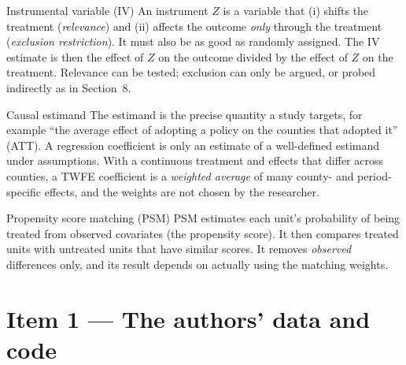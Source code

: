 \documentclass[11pt]{article}
\begin{document}
\begin{conceptbox}{Instrumental variable (IV)}
An instrument $Z$ is a variable that (i) shifts the treatment (\emph{relevance}) and (ii) affects the outcome \emph{only} through the treatment (\emph{exclusion restriction}). It must also be as good as randomly assigned. The IV estimate is then the effect of $Z$ on the outcome divided by the effect of $Z$ on the treatment. Relevance can be tested; exclusion can only be argued, or probed indirectly as in Section~8.
\end{conceptbox}

\begin{conceptbox}{Causal estimand}
The estimand is the precise quantity a study targets, for example ``the average effect of adopting a policy on the counties that adopted it'' (ATT). A regression coefficient is only an estimate of a well-defined estimand under assumptions. With a continuous treatment and effects that differ across counties, a TWFE coefficient is a \emph{weighted average} of many county- and period-specific effects, and the weights are not chosen by the researcher.
\end{conceptbox}

\begin{conceptbox}{Propensity score matching (PSM)}
PSM estimates each unit's probability of being treated from observed covariates (the propensity score). It then compares treated units with untreated units that have similar scores. It removes \emph{observed} differences only, and its result depends on actually using the matching weights.
\end{conceptbox}

\section{Item 1 --- The authors' data and code}
\end{document}
